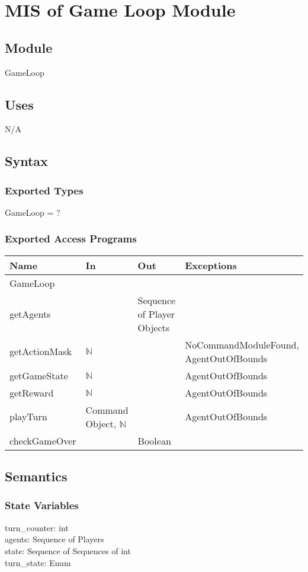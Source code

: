 \documentclass[12pt, titlepage]{article}
\begin{document}
\newpage
\section{MIS of Game Loop Module} \label{GLModule} 
\subsection{Module}
GameLoop

\subsection{Uses}
N/A

\subsection{Syntax}
\subsubsection{Exported Types}
GameLoop = ?

\subsubsection{Exported Access Programs}

\begin{tabular}{p{3cm} p{4cm} p{4cm} p{5cm}}
\hline
\textbf{Name} & \textbf{In} & \textbf{Out} & \textbf{Exceptions} \\
\hline
GameLoop & & &  \\
getAgents & & Sequence of Player Objects & \\
getActionMask & $\mathbb{N}$ & & NoCommandModuleFound, AgentOutOfBounds\\
getGameState & $\mathbb{N}$ & & AgentOutOfBounds\\
getReward & $\mathbb{N}$ & & AgentOutOfBounds\\
playTurn & Command Object, $\mathbb{N}$ & & AgentOutOfBounds\\
checkGameOver & & Boolean & \\
\hline
\end{tabular}

\subsection{Semantics}

\subsubsection{State Variables}
turn\_counter: int \\
agents: Sequence of Players \\
state: Sequence of Sequences of int\\
turn\_state: Enum\\
\end{document}
